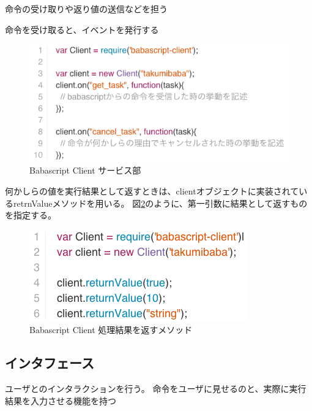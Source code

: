 命令の受け取りや返り値の送信などを担う

命令を受け取ると、イベントを発行する

\begin{figure}[htbp]
  \begin{center}
  \includegraphics[width=.8\linewidth,bb=0 0 560 253]{images/babascript_client_service.js.png}
  \end{center}
  \caption{Babascript Client サービス部}
  \label{fig:babascript_client_service}
\end{figure}

何かしらの値を実行結果として返すときは、clientオブジェクトに実装されているretrnValueメソッドを用いる。
図\ref{fig:babascript_client_service_returnvalue}のように、第一引数に結果として返すものを指定する。

\begin{figure}[htbp]
  \begin{center}
  \includegraphics[width=.8\linewidth,bb=0 0 357 149]{images/babascript_client_service_returnvalue.js.png}
  \end{center}
  \caption{Babascript Client 処理結果を返すメソッド}
  \label{fig:babascript_client_service_returnvalue}
\end{figure}

\subsection{インタフェース}\label{ux30a4ux30f3ux30bfux30d5ux30a7ux30fcux30b9}

ユーザとのインタラクションを行う。
命令をユーザに見せるのと、実際に実行結果を入力させる機能を持つ

